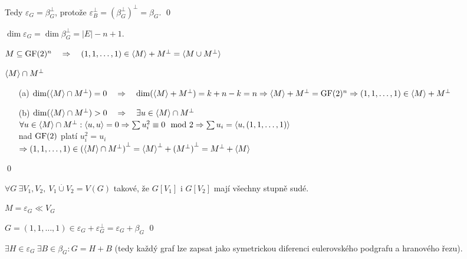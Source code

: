 Tedy $\varepsilon_G = \beta_G^\bot$, protože $\varepsilon_B^\bot = {\left(\beta_G^\bot\right)}^\bot = \beta_G$.
\qed

\dsl $\dim \varepsilon_G = \dim \beta_G^\bot = |E| - n + 1$.


\vt $M \subseteq \mathrm{GF}(2)^n \quad\Rightarrow\quad (1,1,\dots,1) \in {\langle M\rangle} + M^\bot = {\langle M\cup M^\bot\rangle}$

\dk ${\langle M\rangle} \cap M^\bot$
\begin{enumerate}
\item[(a)] $\dim({\langle M\rangle} \cap M^\bot) = 0 \quad\Rightarrow\quad \dim({\langle M\rangle} + M^\bot) = k+n-k = n \Rightarrow {\langle M\rangle} + M^\bot = \mathrm{GF}(2)^n \Rightarrow (1,1,\dots,1)\in {\langle M\rangle} + M^\bot$
\item[(b)] $\dim({\langle M\rangle} \cap M^\bot) > 0 \quad\Rightarrow\quad \exists u\in {\langle M\rangle} \cap M^\bot$ \\ 
$\forall u\in {\langle M\rangle} \cap M^\bot: {\langle u,u\rangle} = 0 \Rightarrow \sum u_i^2 \equiv 0 \mod 2 \Rightarrow \sum u_i = {\langle u, (1,1,\dots,1)\rangle}$ \\
nad $\mathrm{GF}(2)$ platí $u_i^2 = u_i$ \\
$\Rightarrow (1,1,\dots,1) \in {({\langle M\rangle} \cap M^\bot)}^\bot = {{\langle M\rangle}}^\bot + {(M^\bot)}^\bot = M^\bot + {\langle M\rangle}$
\end{enumerate}
\qed


\vt $\forall G \ \exists V_1,V_2,\ V_1\overset{.}{\cup} V_2 = V(G)$ takové, že
$G[V_1]$ i $G[V_2]$ mají všechny stupně sudé.

\dk $M = \varepsilon_G \ll V_G$

$G = (1,1,\dots,1) \in \varepsilon_G + \varepsilon_G^\bot = \varepsilon_G + \beta_G$
\qed

\dsl $\exists H \in \varepsilon_G\ \exists B\in \beta_G: G = H + B$ (tedy každý graf lze zapsat jako symetrickou diferenci eulerovského podgrafu a hranového řezu).


